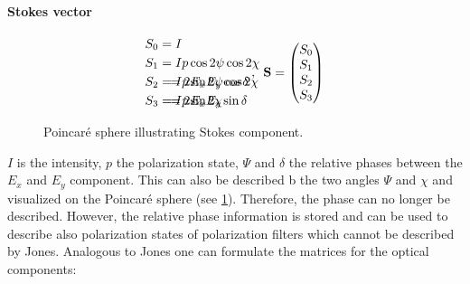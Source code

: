 \paragraph{Stokes vector}
\begin{align}
\begin{split}
S_0 &= I \\
S_1 &= I p \cos 2\psi \cos 2\chi \\
S_2 &= I p \sin 2\psi \cos 2\chi \\
S_3 &= I p \sin 2\chi
\end{split}
\hspace{-7.5em}
\begin{split}
& \\
& \\
&= 2 E_x E_y \cos \delta \\
&= 2 E_x E_y \sin \delta
\end{split}
\: , \enspace
\vec{S} =
\begin{pmatrix} S_0 \\ S_1 \\ S_2 \\ S_3\end{pmatrix}
\end{align}
%
\begin{figure}[!t]
	\centering
	\caption{Poincar\'e sphere illustrating Stokes component.}
	\label{fig:stokesPoincare}
\end{figure}
%
$I$ is the intensity, $p$ the polarization state, $\Psi$ and $\delta$ the relative phases between the $E_x$ and $E_y$ component.
This can also be described b the two angles $\Psi$ and $\chi$ and visualized on the Poincar\'e sphere (see \cref{fig:stokesPoincare}).
Therefore, the phase can no longer be described.
However, the relative phase information is stored and can be used to describe also polarization states of polarization filters which cannot be described by Jones.
Analogous to Jones one can formulate the matrices for the optical components:
%
